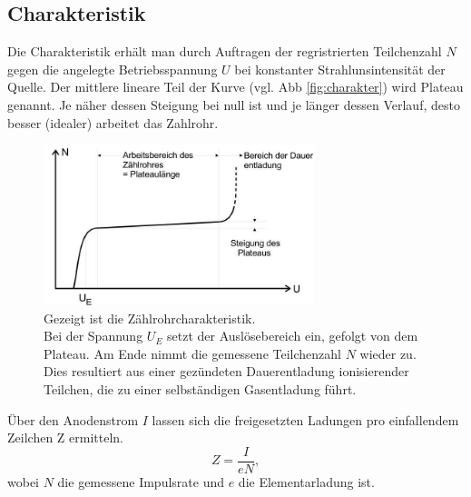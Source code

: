 \subsection{Charakteristik}
Die Charakteristik erhält man durch Auftragen der regristrierten Teilchenzahl $N$
gegen die angelegte Betriebsspannung $U$ bei konstanter Strahlunsintensität der Quelle.
Der mittlere lineare Teil der Kurve (vgl. Abb \ref{fig:charakter}) wird Plateau genannt.
Je näher dessen Steigung bei null ist und je länger dessen Verlauf, desto besser (idealer) arbeitet 
das Zahlrohr.
\begin{figure}
    \centering
    \includegraphics[width=0.7\textwidth]{input/charakteristik.jpg}
    \caption{Gezeigt ist die Zählrohrcharakteristik.\\
    Bei der Spannung $U_E$ setzt der Auslösebereich ein, gefolgt von dem
    Plateau. Am Ende nimmt die gemessene Teilchenzahl $N$ wieder zu.
    Dies resultiert aus einer gezündeten Dauerentladung ionisierender Teilchen,
    die zu einer selbständigen Gasentladung führt.\cite[224]{anleitung}}
\end{figure}
Über den Anodenstrom $I$ lassen sich die freigesetzten Ladungen pro einfallendem Zeilchen Z
ermitteln.
\begin{equation}
    Z=\frac{I}{eN},
    \label{eqn:strom}
\end{equation}
wobei $N$ die gemessene Impulsrate und $e$ die Elementarladung ist.
